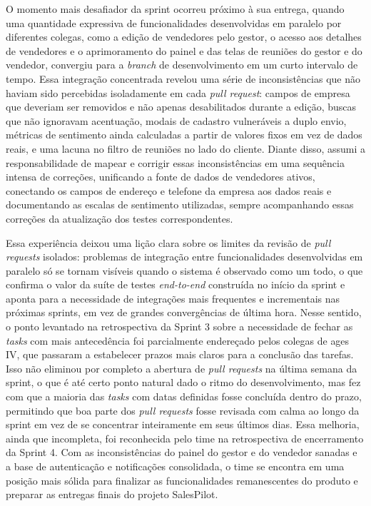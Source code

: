 O momento mais desafiador da sprint ocorreu próximo à sua entrega, quando uma quantidade expressiva de funcionalidades desenvolvidas em paralelo por diferentes colegas, como a edição de vendedores pelo gestor, o acesso aos detalhes de vendedores e o aprimoramento do painel e das telas de reuniões do gestor e do vendedor, convergiu para a \textit{branch} de desenvolvimento em um curto intervalo de tempo. Essa integração concentrada revelou uma série de inconsistências que não haviam sido percebidas isoladamente em cada \textit{pull request}: campos de empresa que deveriam ser removidos e não apenas desabilitados durante a edição, buscas que não ignoravam acentuação, modais de cadastro vulneráveis a duplo envio, métricas de sentimento ainda calculadas a partir de valores fixos em vez de dados reais, e uma lacuna no filtro de reuniões no lado do cliente. Diante disso, assumi a responsabilidade de mapear e corrigir essas inconsistências em uma sequência intensa de correções, unificando a fonte de dados de vendedores ativos, conectando os campos de endereço e telefone da empresa aos dados reais e documentando as escalas de sentimento utilizadas, sempre acompanhando essas correções da atualização dos testes correspondentes.

Essa experiência deixou uma lição clara sobre os limites da revisão de \textit{pull requests} isolados: problemas de integração entre funcionalidades desenvolvidas em paralelo só se tornam visíveis quando o sistema é observado como um todo, o que confirma o valor da suíte de testes \textit{end-to-end} construída no início da sprint e aponta para a necessidade de integrações mais frequentes e incrementais nas próximas sprints, em vez de grandes convergências de última hora. Nesse sentido, o ponto levantado na retrospectiva da Sprint 3 sobre a necessidade de fechar as \textit{tasks} com mais antecedência foi parcialmente endereçado pelos colegas de \ac{ages} IV, que passaram a estabelecer prazos mais claros para a conclusão das tarefas. Isso não eliminou por completo a abertura de \textit{pull requests} na última semana da sprint, o que é até certo ponto natural dado o ritmo do desenvolvimento, mas fez com que a maioria das \textit{tasks} com datas definidas fosse concluída dentro do prazo, permitindo que boa parte dos \textit{pull requests} fosse revisada com calma ao longo da sprint em vez de se concentrar inteiramente em seus últimos dias. Essa melhoria, ainda que incompleta, foi reconhecida pelo time na retrospectiva de encerramento da Sprint 4. Com as inconsistências do painel do gestor e do vendedor sanadas e a base de autenticação e notificações consolidada, o time se encontra em uma posição mais sólida para finalizar as funcionalidades remanescentes do produto e preparar as entregas finais do projeto SalesPilot.
